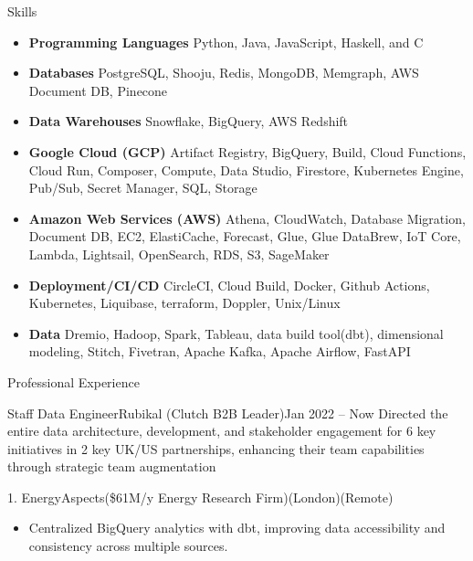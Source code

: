 \documentclass[]{ahmedamrcv}
\begin{document}
        \begin{cvsection}{Skills}
		\begin{cvsubsection}{}{}{}	
			\begin{itemize}
				\item \textbf{Programming Languages} Python, Java, JavaScript, Haskell, and C
                    \item \textbf{Databases} PostgreSQL, Shooju, Redis, MongoDB, Memgraph, AWS Document DB, Pinecone
                    \item \textbf{Data Warehouses} Snowflake, BigQuery, AWS Redshift 
				\item \textbf{Google Cloud (GCP)} Artifact Registry, BigQuery, Build, Cloud Functions, Cloud Run, Composer, Compute, Data Studio, Firestore, Kubernetes Engine, Pub/Sub, Secret Manager, SQL, Storage
                    \item \textbf{Amazon Web Services (AWS)} Athena, CloudWatch, Database Migration, Document DB, EC2, ElastiCache, Forecast, Glue, Glue DataBrew, IoT Core, Lambda, Lightsail, OpenSearch, RDS, S3, SageMaker
				\item \textbf{Deployment/CI/CD} CircleCI, Cloud Build, Docker, Github Actions, Kubernetes, Liquibase, terraform, Doppler, Unix/Linux
				\item \textbf{Data} Dremio, Hadoop, Spark, Tableau, data build tool(dbt), dimensional modeling, Stitch, Fivetran, Apache Kafka, Apache Airflow, FastAPI
			\end{itemize}
		\end{cvsubsection}
        

	\begin{cvsection}{Professional Experience}
            \begin{cvsubsection}{Staff Data Engineer}{Rubikal (Clutch B2B Leader)}{Jan 2022 -- Now}
            Directed the entire data architecture, development, and stakeholder engagement for 6 key initiatives in 2 key UK/US partnerships, enhancing their team capabilities through strategic team augmentation

                \begin{cvsubsection}{1. EnergyAspects}{(\$61M/y Energy Research Firm)}{(London)(Remote)}
    			\begin{itemize}
                        \item Centralized BigQuery analytics with dbt, improving data accessibility and consistency across multiple sources.
        

\end{itemize}
\end{cvsubsection}
\end{cvsubsection}
\end{cvsection}
\end{cvsection}
\end{document}
